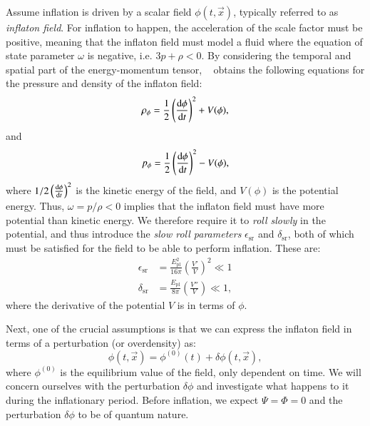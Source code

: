     Assume inflation is driven by a scalar field $\phi(t,\vec{x})$, typically referred to as \textit{inflaton field}. For inflation to happen, the acceleration of the scale factor must be positive, meaning that the inflaton field must model a fluid where the equation of state parameter $\omega$ is negative, i.e. $3p+\rho<0$. By considering the temporal and spatial part of the energy-momentum tensor, ~\cite{dodelson2020modern} obtains the following equations for the pressure and density of the inflaton field:
    \begin{equation}\label{eq:m3:theory:inflaton_density}
        \rho_\phi = \frac{1}{2}\left(\dv{\phi}{t}\right)^2+V(\phi),
    \end{equation}
    and 
    \begin{equation}\label{eq:m3:theory:inflaton_pressure}
        p_\phi = \frac{1}{2}\left(\dv{\phi}{t}\right)^2-V(\phi),
    \end{equation}
    where $1/2\left(\dv{\phi}{t}\right)^2$ is the kinetic energy of the field, and $V(\phi)$ is the potential energy. Thus, $\omega = p/\rho < 0$ implies that the inflaton field must have more potential than kinetic energy. We therefore require it to \textit{roll slowly} in the potential, and thus introduce the \textit{slow roll parameters} $\epsilon_\mathrm{sr}$ and $\delta_\mathrm{sr}$, both of which must be satisfied for the field to be able to perform inflation. These are:
    \begin{subequations}\label{eq:m3:theory:slow_roll_parameters}
        \begin{align}
            \epsilon_\mathrm{sr} &= \frac{E_\mathrm{pl}^2}{16\pi}\left(\frac{V'}{V}\right)^2 \ll1 \label{eq:m3:theory:slow_roll_epsilon}\\
            \delta_\mathrm{sr} &= \frac{E_\mathrm{pl}}{8\pi}\left( \frac{V''}{V}\right) \ll1,\label{eq:m3:theory:slow_roll_delta}
        \end{align}
    \end{subequations}
    where the derivative of the potential $V$ is in terms of $\phi$. 

    Next, one of the crucial assumptions is that we can express the inflaton field in terms of a perturbation (or overdensity) as:
    \begin{equation}\label{eq:m3:theory:inflaton_field_perturb}
        \phi(t,\vec{x}) = \phi^{(0)}(t) + \delta\phi(t, \vec{x}),
    \end{equation}
    where $\phi^{(0)}$ is the equilibrium value of the field, only dependent on time. We will concern ourselves with the perturbation $\delta\phi$ and investigate what happens to it during the inflationary period. Before inflation, we expect $\Psi = \Phi =0$ and the perturbation $\delta\phi$ to be of quantum nature. 

